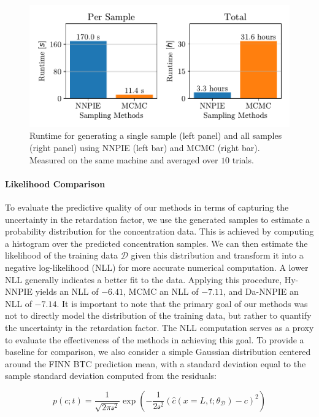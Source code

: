 \begin{figure}[h]
    \centering
    \includegraphics{figs/runtime_comparison.pdf}
    \caption{Runtime for generating a single sample (left panel) and all samples (right panel) using NNPIE (left bar) and MCMC (right bar). Measured on the same machine and averaged over $10$ trials.}
    \label{fig:runtime_comparison}
\end{figure}



\paragraph{Likelihood Comparison}
\label{sec:likelihood}
To evaluate the predictive quality of our methods in terms of capturing the uncertainty in the retardation factor, we use the generated samples to estimate a probability distribution for the concentration data. This is achieved by computing a histogram over the predicted concentration samples. We can then estimate the likelihood of the training data $\mathcal{D}$ given this distribution and transform it into a negative log-likelihood (NLL) for more accurate numerical computation. A lower NLL generally indicates a better fit to the data. Applying this procedure, Hy-NNPIE yields an NLL of $-6.41$, MCMC an NLL of $-7.11$, and Da-NNPIE an NLL of $-7.14$. It is important to note that the primary goal of our methods was not to directly model the distribution of the training data, but rather to quantify the uncertainty in the retardation factor. The NLL computation serves as a proxy to evaluate the effectiveness of the methods in achieving this goal. To provide a baseline for comparison, we also consider a simple Gaussian distribution centered around the FINN BTC prediction mean, with a standard deviation equal to the sample standard deviation computed from the residuals:

\begin{equation*}
    p(c; t) = \frac{1}{\sqrt{2 \pi \mathcal{s}^2}} \exp(-\frac{1}{2 \mathcal{s}^2} (\hat{c}(x=L, t; \theta_{\mathcal{D}}) - c)^2)
\end{equation*}

